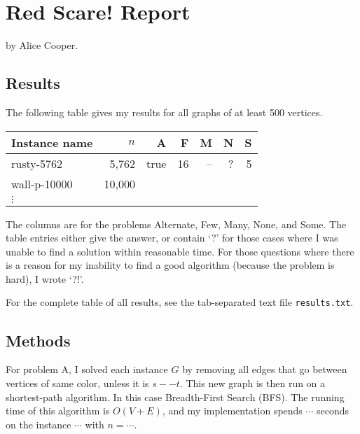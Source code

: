\documentclass{tufte-handout}
\begin{document}
\section{Red Scare! Report}

by Alice Cooper.

\subsection{Results}

The following table gives my results for all graphs of at least 500 vertices.

\medskip
\begin{tabular}{lrrrrrr}
  \toprule
  Instance name & $n$ & A & F & M & N & S \\
  \midrule
  rusty-5762 & 5,762 & true & 16 & -- & ? & 5 \\
  wall-p-10000 & 10,000 &\\	
  $\vdots$\\
  \bottomrule
\end{tabular}
\medskip

The columns are for the problems Alternate, Few, Many, None, and Some.
The table entries either give the answer, or contain `?' for those cases where I was unable to find a solution within reasonable time.
For those questions where there is a reason for my inability to find a good algorithm (because the problem is hard), I wrote `?!'.

For the complete table of all results, see the tab-separated text file {\tt results.txt}.

\subsection{Methods}

For problem A, I solved each instance $G$ by removing all edges that go between vertices of same color, unless it is $s -- t$. This new graph is then run on a shortest-path algorithm. In this case Breadth-First Search (BFS).
The running time of this algorithm is $O(V + E)$, and my implementation spends $\cdots$ seconds on the instance $\cdots$ with  $n=\cdots$.
\end{document}
